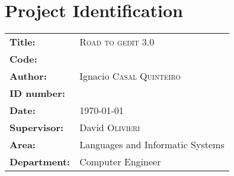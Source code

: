 
\chapter{Project Identification}

\begin{tabular}{ll}
  \textbf{Title:} & \textsc{Road to gedit 3.0}\\
  \textbf{Code:} & \\[0.5cm] %
  \textbf{Author:} & Ignacio \textsc{Casal Quinteiro}\\
  \textbf{ID number:} & \\ %
  \textbf{Date:} & \today \\[0.5cm]
  \textbf{Supervisor:} & David \textsc{Olivieri}\\
  \textbf{Area:} & Languages and Informatic Systems\\
  \textbf{Department:} & Computer Engineer\\
\end{tabular}
